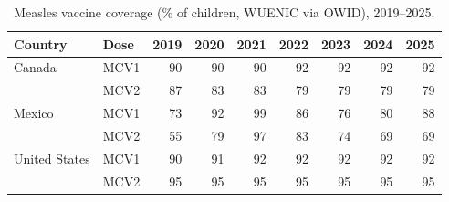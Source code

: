 \begin{table}[H]
\caption{Measles vaccine coverage (\% of children, WUENIC via OWID), 2019--2025.\label{tab:cov}}
\centering
\small
\begin{tabular}{llrrrrrrr}
\toprule
\textbf{Country} & \textbf{Dose} & \textbf{2019} & \textbf{2020} & \textbf{2021} & \textbf{2022} & \textbf{2023} & \textbf{2024} & \textbf{2025}\\
\midrule
Canada & MCV1 & 90 & 90 & 90 & 92 & 92 & 92 & 92\\
 & MCV2 & 87 & 83 & 83 & 79 & 79 & 79 & 79\\
Mexico & MCV1 & 73 & 92 & 99 & 86 & 76 & 80 & 88\\
 & MCV2 & 55 & 79 & 97 & 83 & 74 & 69 & 69\\
United States & MCV1 & 90 & 91 & 92 & 92 & 92 & 92 & 92\\
 & MCV2 & 95 & 95 & 95 & 95 & 95 & 95 & 95\\
\bottomrule
\end{tabular}
\end{table}
